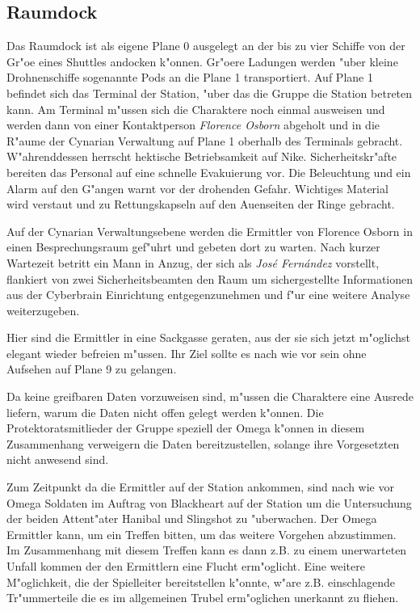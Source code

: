 \subsection{Raumdock}
Das Raumdock ist als eigene Plane 0 ausgelegt an der bis zu vier Schiffe von der Gr"o\3e eines Shuttles andocken k"onnen. Gr"o\3ere Ladungen werden "uber kleine Drohnenschiffe sogenannte Pods an die Plane 1 transportiert. Auf Plane 1 befindet sich das Terminal der Station, "uber das die Gruppe die Station betreten kann. Am Terminal m"ussen sich die Charaktere noch einmal ausweisen und werden dann von einer Kontaktperson \emph{Florence Osborn} abgeholt und in die R"aume der Cynarian Verwaltung auf Plane 1 oberhalb des Terminals gebracht. W"ahrenddessen herrscht hektische Betriebsamkeit auf Nike. Sicherheitskr"afte bereiten das Personal auf eine schnelle Evakuierung vor. Die Beleuchtung und ein Alarm auf den G"angen warnt vor der drohenden Gefahr. Wichtiges Material wird verstaut und zu Rettungskapseln auf den Au\3enseiten der Ringe gebracht.

Auf der Cynarian Verwaltungsebene werden die Ermittler von Florence Osborn in einen Besprechungsraum gef"uhrt und gebeten dort zu warten. Nach kurzer Wartezeit betritt ein Mann in Anzug, der sich als \emph{Jos\'e Fern\'andez} vorstellt, flankiert von zwei Sicherheitsbeamten den Raum um sichergestellte Informationen aus der Cyberbrain Einrichtung entgegenzunehmen und f"ur eine weitere Analyse weiterzugeben. 

\begin{remarks}
	Hier sind die Ermittler in eine Sackgasse geraten, aus der sie sich jetzt m"oglichst elegant wieder befreien m"ussen. Ihr Ziel sollte es nach wie vor sein ohne Aufsehen auf Plane 9 zu gelangen. 

	Da keine greifbaren Daten vorzuweisen sind, m"ussen die Charaktere eine Ausrede liefern, warum die Daten nicht offen gelegt werden k"onnen. Die Protektoratsmitlieder der Gruppe speziell der Omega k"onnen in diesem Zusammenhang verweigern die Daten bereitzustellen, solange ihre Vorgesetzten nicht anwesend sind.

	Zum Zeitpunkt da die Ermittler auf der Station ankommen, sind nach wie vor Omega Soldaten im Auftrag von Blackheart auf der Station um die Untersuchung der beiden Attent"ater Hanibal und Slingshot zu "uberwachen. Der Omega Ermittler kann, um ein Treffen bitten, um das weitere Vorgehen abzustimmen. Im Zusammenhang mit diesem Treffen kann es dann z.B. zu einem unerwarteten Unfall kommen der den Ermittlern eine Flucht erm"oglicht. Eine weitere M"oglichkeit, die der Spielleiter bereitstellen k"onnte, w"are z.B. einschlagende Tr"ummerteile die es im allgemeinen Trubel erm"oglichen unerkannt zu fliehen.
\end{remarks}
